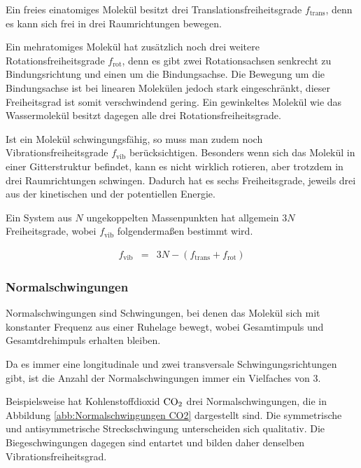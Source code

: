 \documentclass[12pt,a4paper]{scrartcl}
\numberwithin{equation}{section} %
\begin{document}
	Ein freies einatomiges Molekül besitzt drei Translationsfreiheitsgrade $f_\mathrm{trans}$, denn es kann sich frei in drei Raumrichtungen bewegen. \cite{Gerthsen}
	
	Ein mehratomiges Molekül hat zusätzlich noch drei weitere Rotationsfreiheitsgrade $f_\mathrm{rot}$, denn es gibt zwei Rotationsachsen senkrecht zu Bindungsrichtung und einen um die Bindungsachse. Die Bewegung um die Bindungsachse ist bei linearen Molekülen jedoch stark eingeschränkt, dieser Freiheitsgrad ist somit verschwindend gering. \cite{Freiheitsgrad} Ein gewinkeltes Molekül wie das Wassermolekül besitzt dagegen alle drei Rotationsfreiheitsgrade. \cite{Gerthsen}
	
	Ist ein Molekül schwingungsfähig, so muss man zudem noch Vibrationsfreiheitsgrade $f_\mathrm{vib}$ berücksichtigen. Besonders wenn sich das Molekül in einer Gitterstruktur befindet, kann es nicht wirklich rotieren, aber trotzdem in drei Raumrichtungen schwingen. Dadurch hat es sechs Freiheitsgrade, jeweils drei aus der kinetischen und der potentiellen Energie.
	
	Ein System aus $N$ ungekoppelten Massenpunkten hat allgemein $3N$ Freiheitsgrade, wobei $f_\mathrm{vib}$ folgendermaßen bestimmt wird. \cite{Gerthsen}
	
	\begin{eqnarray}
		f_\mathrm{vib} &=& 3N - (f_\mathrm{trans} + f_\mathrm{rot})
	\end{eqnarray}
	
	\subsubsection{Normalschwingungen}
	\label{Normalschwingungen}
	
	Normalschwingungen sind Schwingungen, bei denen das Molekül sich mit konstanter Frequenz aus einer Ruhelage bewegt, wobei Gesamtimpuls und Gesamtdrehimpuls erhalten bleiben.
	
	Da es immer eine longitudinale und zwei transversale Schwingungsrichtungen gibt, ist die Anzahl der Normalschwingungen immer ein Vielfaches von $3$. \cite{Gerthsen}
	
	Beispielsweise hat Kohlenstoffdioxid $\ce{CO_2}$ drei Normalschwingungen, die in Abbildung \ref{abb:Normalschwingungen CO2} dargestellt sind. Die symmetrische und antisymmetrische Streckschwingung unterscheiden sich qualitativ. Die Biegeschwingungen dagegen sind entartet und bilden daher denselben Vibrationsfreiheitsgrad.
	
\end{document}
